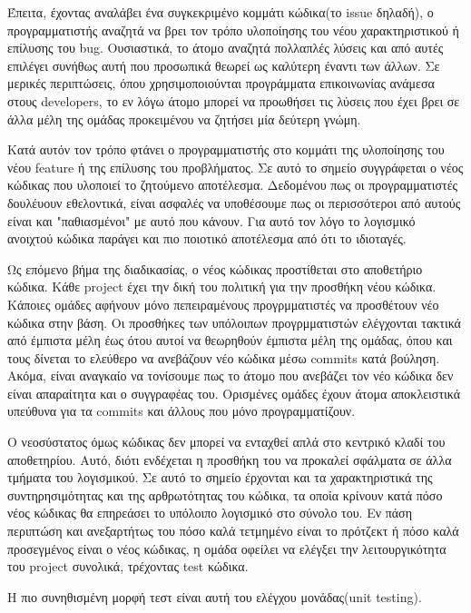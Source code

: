 \documentclass[a4paper, 11pt]{article}
\begin{document}
{{Έπειτα, έχοντας αναλάβει ένα συγκεκριμένο κομμάτι κώδικα(το \textlatin{issue} δηλαδή), ο προγραμματιστής αναζητά να βρει τον τρόπο υλοποίησης του νέου χαρακτηριστικού ή επίλυσης του \textlatin{bug}. Ουσιαστικά, το άτομο αναζητά πολλαπλές λύσεις και από αυτές επιλέγει συνήθως αυτή που προσωπικά θεωρεί ως καλύτερη έναντι των άλλων. Σε μερικές περιπτώσεις, όπου χρησιμοποιούνται προγράμματα επικοινωνίας ανάμεσα στους \textlatin{developers}, το εν λόγω άτομο μπορεί να προωθήσει τις λύσεις που έχει βρει σε άλλα μέλη της ομάδας προκειμένου να ζητήσει μία δεύτερη γνώμη.

Κατά αυτόν τον τρόπο φτάνει ο προγραμματιστής στο κομμάτι της υλοποίησης του νέου \textlatin{feature} ή της επίλυσης του προβλήματος. Σε αυτό το σημείο συγγράφεται ο νέος κώδικας που υλοποιεί το ζητούμενο αποτέλεσμα. Δεδομένου πως οι προγραμματιστές δουλέυουν εθελοντικά, είναι ασφαλές να υποθέσουμε πως οι περισσότεροι από αυτούς είναι και "παθιασμένοι" με αυτό που κάνουν. Για αυτό τον λόγο το λογισμικό ανοιχτού κώδικα παράγει και πιο ποιοτικό αποτέλεσμα από ότι το ιδιοταγές.

Ως επόμενο βήμα της διαδικασίας, ο νέος κώδικας προστίθεται στο αποθετήριο κώδικα. Κάθε \textlatin{project} έχει την δική του πολιτική για την προσθήκη νέου κώδικα. Κάποιες ομάδες αφήνουν μόνο πεπειραμένους προγρμματιστές να προσθέτουν νέο κώδικα στην βάση. Οι προσθήκες των υπόλοιπων προγρμματιστών ελέγχονται τακτικά από έμπιστα μέλη έως ότου αυτοί να θεωρηθούν έμπιστα μέλη της ομάδας, όπου και τους δίνεται το ελεύθερο να ανεβάζουν νέο κώδικα μέσω \textlatin{commits} κατά βούληση. Ακόμα, είναι αναγκαίο να τονίσουμε πως το άτομο που ανεβάζει τον νέο κώδικα δεν είναι απαραίτητα και ο συγγραφέας του. Ορισμένες ομάδες έχουν άτομα αποκλειστικά υπεύθυνα για τα \textlatin{commits} και άλλους που μόνο προγραμματίζουν.

Ο νεοσύστατος όμως κώδικας δεν μπορεί να ενταχθεί απλά στο κεντρικό κλαδί του αποθετηρίου. Αυτό, διότι ενδέχεται η προσθήκη του να προκαλεί σφάλματα σε άλλα τμήματα του λογισμικού. Σε αυτό το σημείο έρχονται και τα χαρακτηριστικά της συντηρησιμότητας και της αρθρωτότητας του κώδικα, τα οποία κρίνουν κατά πόσο νέος κώδικας θα επηρεάσει το υπόλοιπο λογισμικό στο σύνολο του. Εν πάση περιπτώση και ανεξαρτήτως του πόσο καλά τετμημένο είναι το πρότζεκτ ή πόσο καλά προσεγμένος είναι ο νέος κώδικας, η ομάδα οφείλει να ελέγξει την λειτουργικότητα του \textlatin{project} συνολικά, τρέχοντας \textlatin{test} κώδικα.

Η πιο συνηθισμένη μορφή τεστ είναι αυτή του ελέγχου μονάδας(\textlatin{unit testing}).

}}
\end{document}
